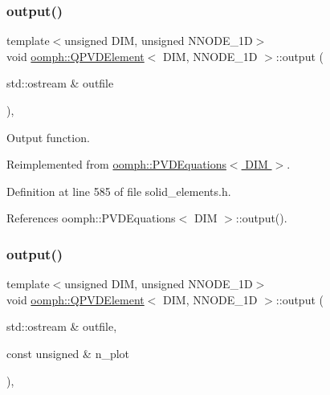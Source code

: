 \subsubsection{\texorpdfstring{output()}{output()}\hspace{0.1cm}{\footnotesize\ttfamily [1/4]}}
{\footnotesize\ttfamily template$<$unsigned D\+IM, unsigned N\+N\+O\+D\+E\+\_\+1D$>$ \\
void \hyperlink{classoomph_1_1QPVDElement}{oomph\+::\+Q\+P\+V\+D\+Element}$<$ D\+IM, N\+N\+O\+D\+E\+\_\+1D $>$\+::output (\begin{DoxyParamCaption}\item[{std\+::ostream \&}]{outfile }\end{DoxyParamCaption})\hspace{0.3cm}{\ttfamily [inline]}, {\ttfamily [virtual]}}



Output function. 



Reimplemented from \hyperlink{classoomph_1_1PVDEquations_ab9e919921934cfe7433420bd2e4482f5}{oomph\+::\+P\+V\+D\+Equations$<$ D\+I\+M $>$}.



Definition at line 585 of file solid\+\_\+elements.\+h.



References oomph\+::\+P\+V\+D\+Equations$<$ D\+I\+M $>$\+::output().

\mbox{\label{classoomph_1_1QPVDElement_a15611416b32a40e0aa67261e8c0a1188}} 
\subsubsection{\texorpdfstring{output()}{output()}\hspace{0.1cm}{\footnotesize\ttfamily [2/4]}}
{\footnotesize\ttfamily template$<$unsigned D\+IM, unsigned N\+N\+O\+D\+E\+\_\+1D$>$ \\
void \hyperlink{classoomph_1_1QPVDElement}{oomph\+::\+Q\+P\+V\+D\+Element}$<$ D\+IM, N\+N\+O\+D\+E\+\_\+1D $>$\+::output (\begin{DoxyParamCaption}\item[{std\+::ostream \&}]{outfile,  }\item[{const unsigned \&}]{n\+\_\+plot }\end{DoxyParamCaption})\hspace{0.3cm}{\ttfamily [inline]}, {\ttfamily [virtual]}}



